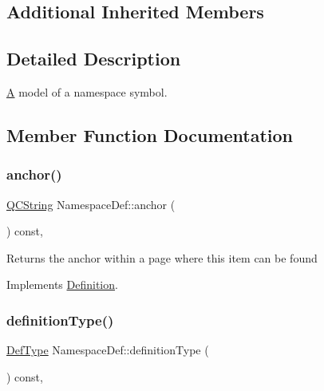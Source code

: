 \subsection*{Additional Inherited Members}


\subsection{Detailed Description}
\mbox{\hyperlink{class_a}{A}} model of a namespace symbol. 

\subsection{Member Function Documentation}
\mbox{\label{class_namespace_def_ad315129c7f091c2cec0d611a592d98a2}} 
\subsubsection{\texorpdfstring{anchor()}{anchor()}}
{\footnotesize\ttfamily \mbox{\hyperlink{class_q_c_string}{Q\+C\+String}} Namespace\+Def\+::anchor (\begin{DoxyParamCaption}{ }\end{DoxyParamCaption}) const\hspace{0.3cm}{\ttfamily [inline]}, {\ttfamily [virtual]}}

Returns the anchor within a page where this item can be found 

Implements \mbox{\hyperlink{class_definition_a56e91f9b76f41208a22cfb2336871604}{Definition}}.

\mbox{\label{class_namespace_def_a1d3f855eb7cac3c7b13a00d78037823b}} 
\subsubsection{\texorpdfstring{definitionType()}{definitionType()}}
{\footnotesize\ttfamily \mbox{\hyperlink{class_definition_intf_ada60114bc621669dd8c19edfc6421766}{Def\+Type}} Namespace\+Def\+::definition\+Type (\begin{DoxyParamCaption}{ }\end{DoxyParamCaption}) const\hspace{0.3cm}{\ttfamily [inline]}, {\ttfamily [virtual]}}


